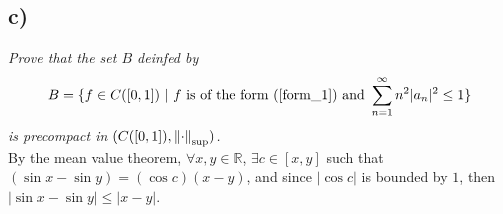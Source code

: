 \documentclass[12pt]{article}
\begin{document}

\subsection*{ c)}
\emph{Prove that the set $B$ deinfed by}
\begin{equation*}
	B = \{f \in C([0,1])\ |\ f \text{ is of the form (\ref{form_1}) and } \sum_{n=1}^\infty n^2|a_n|^2 \leq 1\}
\end{equation*}
\emph{is precompact in $(C([0,1]), \norm{\cdot}_{\text{sup}})$.}\\

By the mean value theorem, $\forall x, y \in \mathbb{R}$, $\exists c\in[x,y]$ such that $(\sin x - \sin y) = (\cos c)(x - y)$, and since $|\cos c|$ is bounded by $1$, then $|\sin x - \sin y| \leq |x - y|$.
\end{document}
